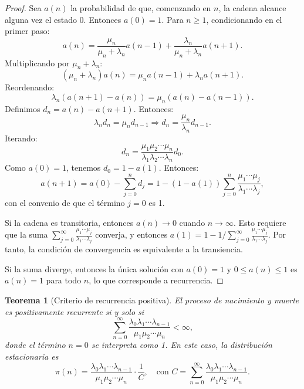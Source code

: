 \documentclass{article}
\theoremstyle{plain}
\newtheorem{Teorema}{Teorema}[section]
\theoremstyle{definition}
\begin{document}
\begin{proof}
  Sea $a(n)$ la probabilidad de que, comenzando en $n$, la cadena alcance alguna vez el estado 0. Entonces $a(0)=1$. Para $n \geq 1$, condicionando en el primer paso:
  \[ a(n) = \frac{\mu_n}{\mu_n + \lambda_n} a(n-1) + \frac{\lambda_n}{\mu_n + \lambda_n} a(n+1). \]
  Multiplicando por $\mu_n + \lambda_n$:
  \[ (\mu_n + \lambda_n) a(n) = \mu_n a(n-1) + \lambda_n a(n+1). \]
  Reordenando:
  \[ \lambda_n (a(n+1) - a(n)) = \mu_n (a(n) - a(n-1)). \]
  Definimos $d_n = a(n) - a(n+1)$. Entonces:
  \[ \lambda_n d_n = \mu_n d_{n-1} \Rightarrow d_n = \frac{\mu_n}{\lambda_n} d_{n-1}. \]
  Iterando:
  \[ d_n = \frac{\mu_1 \mu_2 \cdots \mu_n}{\lambda_1 \lambda_2 \cdots \lambda_n} d_0. \]
  Como $a(0)=1$, tenemos $d_0 = 1 - a(1)$. Entonces:
  \[ a(n+1) = a(0) - \sum_{j=0}^n d_j = 1 - (1 - a(1)) \sum_{j=0}^n \frac{\mu_1 \cdots \mu_j}{\lambda_1 \cdots \lambda_j}, \]
  con el convenio de que el t\'ermino $j=0$ es 1.

  Si la cadena es transitoria, entonces $a(n) \to 0$ cuando $n \to \infty$. Esto requiere que la suma $\sum_{j=0}^\infty \frac{\mu_1 \cdots \mu_j}{\lambda_1 \cdots \lambda_j}$ converja, y entonces $a(1) = 1 - 1/\sum_{j=0}^\infty \frac{\mu_1 \cdots \mu_j}{\lambda_1 \cdots \lambda_j}$. Por tanto, la condici\'on de convergencia es equivalente a la transiencia.

  Si la suma diverge, entonces la \'unica soluci\'on con $a(0)=1$ y $0 \leq a(n) \leq 1$ es $a(n)=1$ para todo $n$, lo que corresponde a recurrencia.
\end{proof}

\begin{Teorema}[Criterio de recurrencia positiva]
  El proceso de nacimiento y muerte es positivamente recurrente si y solo si
  \[ \sum_{n=0}^{\infty} \frac{\lambda_0 \lambda_1 \cdots \lambda_{n-1}}{\mu_1 \mu_2 \cdots \mu_n} < \infty, \]
  donde el t\'ermino $n=0$ se interpreta como 1. En este caso, la distribuci\'on estacionaria es
  \[ \pi(n) = \frac{\lambda_0 \lambda_1 \cdots \lambda_{n-1}}{\mu_1 \mu_2 \cdots \mu_n} \cdot \frac{1}{C}, \quad \text{con } C = \sum_{n=0}^\infty \frac{\lambda_0 \lambda_1 \cdots \lambda_{n-1}}{\mu_1 \mu_2 \cdots \mu_n}. \]
\end{Teorema}
\end{document}

